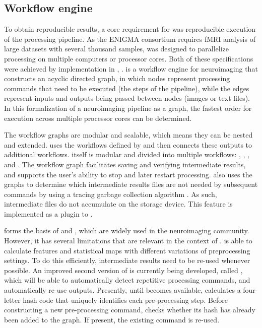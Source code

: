 \subsection{Workflow engine}

To obtain reproducible results, a core requirement for  was reproducible execution of the processing pipeline. As the ENIGMA consortium requires fMRI analysis of large datasets with several thousand samples,  was designed to parallelize processing on multiple computers or processor cores. Both of these specifications were achieved by implementation in ,  \parencite{gorgolewski2011}.  is a workflow engine for neuroimaging that constructs an acyclic directed graph, in which nodes represent processing commands that need to be executed (the steps of the pipeline), while the edges represent inputs and outputs being passed between nodes (images or text files). In this formalization of a neuroimaging pipeline as a graph, the fastest order for execution across multiple processor cores can be determined.

The workflow graphs are modular and scalable, which means they can be nested and extended.  uses the workflows defined by  and then connects these outputs to additional workflows.  itself is modular and divided into multiple workflows:  \parencite{esteban2021b},  \parencite{esteban2020a},  \parencite{esteban2021a}, and  \parencite{goncalves2021}. The workflow graph facilitates saving and verifying intermediate results, and supports the user's ability to stop and later restart processing.  also uses the graphs to determine which intermediate results files are not needed by subsequent commands by using a tracing garbage collection algorithm \parencite{dijkstra1978}. As such, intermediate files do not accumulate on the storage device. This feature is implemented as a plugin to .

 forms the basis of  and , which are widely used in the neuroimaging community. However, it has several limitations that are relevant in the context of .  is able to calculate features and statistical maps with different variations of preprocessing settings. To do this efficiently, intermediate results need to be re-used whenever possible. An improved second version of  is currently being developed, called  \parencite{jarecka2020}, which will be able to automatically detect repetitive processing commands, and automatically re-use outputs. Presently, until  becomes available,  calculates a four-letter hash code that uniquely identifies each pre-processing step. Before constructing a new pre-processing command,  checks whether its hash has already been added to the graph. If present, the existing command is re-used.


